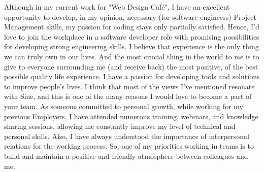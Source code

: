 \documentclass[10pt, a4paper]{awesome-cv}
\begin{document}
\begin{cvletter}
Although in my current work for "Web Design Café", I have an excellent opportunity to develop, in my opinion, necessary (for software engineers) Project Management skills, my passion for coding stays only partially satisfied. Hence, I'd love to join the workplace in a software developer role with promising possibilities for developing strong engineering skills.
I believe that experience is the only thing we can truly own in our lives. And the most crucial thing in the world to me is to give to everyone surrounding me (and receive back) the most positive, of the best possible quality life experience. I have a passion for developing tools and solutions to improve people’s lives. I think that most of the views I’ve mentioned resonate with Sine, and this is one of the many reasons I would love to become a part of your team. 
As someone committed to personal growth, while working for my previous Employers, I have attended numerous training, webinars, and knowledge sharing sessions, allowing me constantly improve my level of technical and personal skills. Also, I have always understood the importance of interpersonal relations for the working process. So, one of my priorities working in teams is to build and maintain a positive and friendly atmosphere between colleagues and me.

\end{cvletter}


\makeletterclosing
\end{document}
